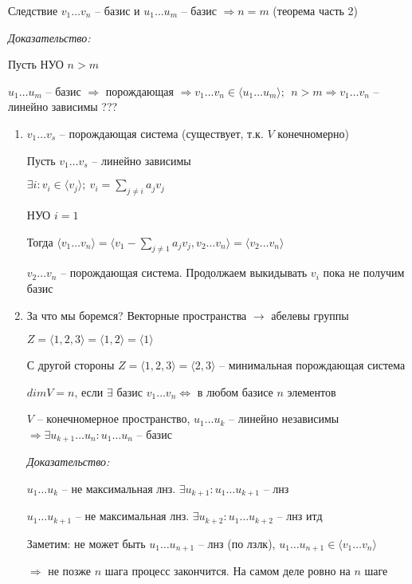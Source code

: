 \documentclass[12pt]{article}
\newcommand{\q}[1]{\langle #1 \rangle}
\begin{document}
\begin{theo}{Следствие}
    $v_1 \ldots v_n$ -- базис и $u_1 \ldots u_m$ -- базис $\Rightarrow n = m$ (теорема часть 2)
\end{theo}

\textit{Доказательство:}

Пусть НУО $n > m$

$u_1 \ldots u_m$ -- базис $\Rightarrow$ порождающая $\Rightarrow v_1 \ldots v_n \in \q{u_1 \ldots u_m};\ \ n > m \Rightarrow v_1 \ldots v_n$ -- линейно зависимы ???

\begin{enumerate}
    \item $v_1 \ldots v_s$ -- порождающая система (существует, т.к. $V$ конечномерно)
    
    Пусть $v_1 \ldots v_s$ -- линейно зависимы

    $\exists i : v_i \in \q{v_j};\ v_i = \sum\limits_{j \neq i} a_jv_j$

    НУО $i = 1$

    Тогда $\q{v_1 \ldots v_n} = \q{v_1 - \sum\limits_{j \neq 1} a_jv_j, v_2 \ldots v_n} = \q{v_2 \ldots v_n}$

    $v_2 \ldots v_n$ -- порождающая система. Продолжаем выкидывать $v_i$ пока не получим базис

    \item 
    
    \begin{Example}{За что мы боремся?}
        Векторные пространства $\rightarrow$ абелевы группы

        $Z = \q{1, 2, 3} = \q{1, 2} = \q{1}$

        С другой стороны $Z = \q{1, 2, 3} = \q{2, 3}$ -- минимальная порождающая система
    \end{Example}
    
    $dimV = n$, если $\exists$ базис $v_1 \ldots v_n \Leftrightarrow$ в любом базисе $n$ элементов

    \begin{lem}{}
        $V$ -- конечномерное пространство, $u_1 \ldots u_k$ -- линейно независимы $\Rightarrow \exists u_{k + 1} \ldots u_n : u_1 \ldots u_n$ -- базис
    \end{lem}

    \textit{Доказательство:}

    $u_1 \ldots u_k$ -- не максимальная лнз. $\exists u_{k + 1} : u_1 \ldots u_{k + 1}$ -- лнз

    $u_1 \ldots u_{k + 1}$ -- не максимальная лнз. $\exists u_{k + 2} : u_1 \ldots u_{k + 2}$ -- лнз итд

    Заметим: не может быть $u_1 \ldots u_{n + 1}$ -- лнз (по лзлк), $u_1 \ldots u_{n + 1} \in \q{v_1 \ldots v_n}$

    $\Rightarrow$ не позже $n$ шага процесс закончится. На самом деле ровно на $n$ шаге
\end{enumerate}
\end{document}
